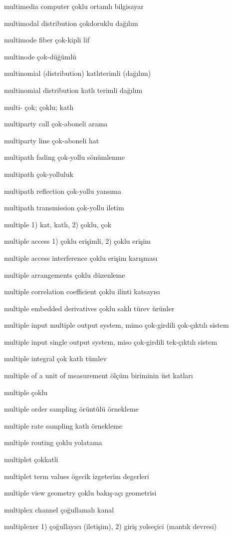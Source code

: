 \documentclass[12pt,fleqn]{article}\usepackage{../../common}
\begin{document}
multimedia computer çoklu ortamlı bilgisayar

multimodal distribution çokdoruklu dağılım

multimode fiber çok-kipli lif

multinode çok-düğümlü

multinomial (distribution) katlıterimli (dağılım)

multinomial distribution katlı terimli dağılım

multi- çok; çoklu; katlı

multiparty call çok-aboneli arama

multiparty line çok-aboneli hat

multipath fading çok-yollu sönümlenme

multipath çok-yolluluk

multipath reflection çok-yollu yansıma

multipath transmission çok-yollu iletim

multiple 1) kat, katlı, 2) çoklu, çok

multiple access 1) çoklu erişimli, 2) çoklu erişim

multiple access interference çoklu erişim karışması

multiple arrangements çoklu düzenleme

multiple correlation coefficient çoklu ilinti katsayısı

multiple embedded derivatives çoklu saklı türev ürünler

multiple input multiple output system, mimo çok-girdili çok-çıktılı sistem

multiple input single output system, miso çok-girdili tek-çıktılı sistem

multiple integral çok katlı tümlev

multiple of a unit of measurement ölçüm biriminin üst katları

multiple çoklu

multiple order sampling örüntülü örnekleme

multiple rate sampling katlı örnekleme

multiple routing çoklu yolatama

multiplet çokkatli

multiplet term values ögecik izgeterim degerleri

multiple view geometry çoklu bakış-açı geometrisi

multiplex channel çoğullamalı kanal

multiplexer 1) çoğullayıcı (iletişim), 2) giriş yolseçici (mantık devresi)
\end{document}

